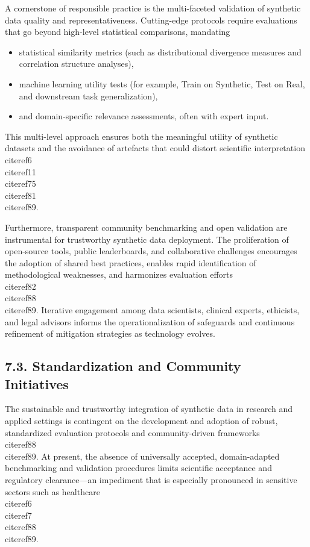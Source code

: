 \documentclass[11pt]{article}
\begin{document}
A cornerstone of responsible practice is the multi-faceted validation of synthetic data quality and representativeness. Cutting-edge protocols require evaluations that go beyond high-level statistical comparisons, mandating

\begin{itemize}
    \item statistical similarity metrics (such as distributional divergence measures and correlation structure analyses),
    \item machine learning utility tests (for example, Train on Synthetic, Test on Real, and downstream task generalization),
    \item and domain-specific relevance assessments, often with expert input.
\end{itemize}

This multi-level approach ensures both the meaningful utility of synthetic datasets and the avoidance of artefacts that could distort scientific interpretation \\cite{ref6}\\cite{ref11}\\cite{ref75}\\cite{ref81}\\cite{ref89}.

Furthermore, transparent community benchmarking and open validation are instrumental for trustworthy synthetic data deployment. The proliferation of open-source tools, public leaderboards, and collaborative challenges encourages the adoption of shared best practices, enables rapid identification of methodological weaknesses, and harmonizes evaluation efforts \\cite{ref82}\\cite{ref88}\\cite{ref89}. Iterative engagement among data scientists, clinical experts, ethicists, and legal advisors informs the operationalization of safeguards and continuous refinement of mitigation strategies as technology evolves.

\subsection{7.3. Standardization and Community Initiatives}

The sustainable and trustworthy integration of synthetic data in research and applied settings is contingent on the development and adoption of robust, standardized evaluation protocols and community-driven frameworks \\cite{ref88}\\cite{ref89}. At present, the absence of universally accepted, domain-adapted benchmarking and validation procedures limits scientific acceptance and regulatory clearance—an impediment that is especially pronounced in sensitive sectors such as healthcare \\cite{ref6}\\cite{ref7}\\cite{ref88}\\cite{ref89}.
\end{document}
